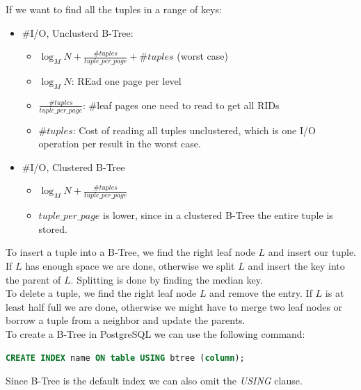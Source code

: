 If we want to find all the tuples in a range of keys:
\begin{itemize}
\item \#I/O, Unclusterd B-Tree:
\begin{itemize}
\item $\log_M N + \frac{\#tuples}{tuple\_per\_page} + \#tuples$ (worst case)
\item $\log_M N$: REad one page per level
\item $\frac{\#tuples}{tuple\_per\_page}$: \#leaf pages one need to read to get all RIDs
\item $\#tuples$: Cost of reading all tuples unclustered, which is one I/O operation per result in the worst case.
\end{itemize}
\item \#I/O, Clustered B-Tree
\begin{itemize}
\item $\log_M N + \frac{\#tuples}{tuple\_per\_page}$
\item $tuple\_per\_page$ is lower, since in a clustered B-Tree the entire tuple is stored.
\end{itemize}
\end{itemize}
To insert a tuple into a B-Tree, we find the right leaf node $L$ and insert our tuple. If $L$ has enough space we are done, otherwise we split $L$ and insert the key into the parent of $L$. Splitting is done by finding the median key.\\
To delete a tuple, we find the right leaf node $L$ and remove the entry. If $L$ is at least half full we are done, otherwise we might have to merge two leaf nodes or borrow a tuple from a neighbor and update the parents.\vspace{.2cm}\\
To create a B-Tree in PostgreSQL we can use the following command:
\begin{lstlisting}[language=SQL]
CREATE INDEX name ON table USING btree (column);
\end{lstlisting}
Since B-Tree is the default index we can also omit the \textit{USING} clause.

